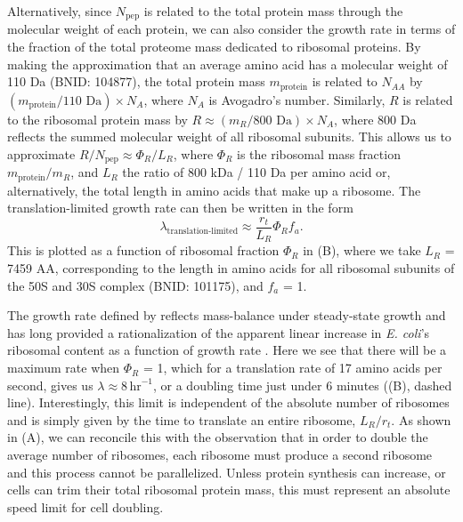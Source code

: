 Alternatively, since $N_\text{pep}$ is related to the total protein mass through the
molecular weight of each protein, we can also consider the growth rate in terms
of the fraction of the total proteome mass dedicated to ribosomal proteins. By
making the approximation that an average amino acid has a molecular weight of
110 Da (BNID: 104877), the total protein mass $m_{\textrm{protein}}$ is related to
$N_{AA}$ by $(m_{\textrm{protein}}/\text{110 Da}) \times N_A$, where $N_A$ is Avogadro's number.
Similarly, $R$ is related to the ribosomal protein mass by $R \approx
(m_R/\text{800 Da}) \times N_A$, where 800 Da reflects the summed molecular weight
of all ribosomal subunits.  This allows us to approximate  $R / N_\text{pep}
\approx \Phi_R / L_R$,  where $\Phi_R$ is the ribosomal mass fraction $m_{\textrm{protein}}/m_R$,
and $L_R$ the ratio of 800 kDa / 110 Da per amino acid or, alternatively, the
total length in amino acids that make up a ribosome. The translation-limited
growth rate can then be written in the form
\begin{equation}
\lambda_{\textrm{translation-limited}} \approx \frac{r_t}{L_R}  \Phi_R f_a.
\label{eq:translation_limit_growth_rate}
\end{equation}
This is plotted as a function of ribosomal fraction $\Phi_R$ in
(B), where we take $L_R$ = 7459 AA, corresponding to the
length in amino acids for all ribosomal subunits of the 50S and 30S complex
(BNID: 101175), and $f_a$ = 1.

The growth rate defined by  reflects
mass-balance under steady-state growth and has long provided a rationalization
of the apparent linear increase in \textit{E. coli}'s ribosomal content as a
function of growth rate \citep{goldberger1979, scott2010}. Here we see that
there will be a maximum rate when $\Phi_R$ = 1, which for a translation rate of
17 amino acids per second, gives us $\lambda \approx 8 \,\text{hr}^{-1}$, or a
doubling time just under 6 minutes ((B), dashed line).
Interestingly, this limit is independent of the absolute number of ribosomes and
is simply given by the time to translate an entire ribosome, $L_R/ r_t$. As
shown in (A), we can reconcile this with the observation
that in order to double the average number of ribosomes, each ribosome must
produce a second ribosome and this process cannot be parallelized. Unless
protein synthesis can increase, or cells can trim their total ribosomal protein
mass, this must represent an absolute speed limit for cell doubling.

